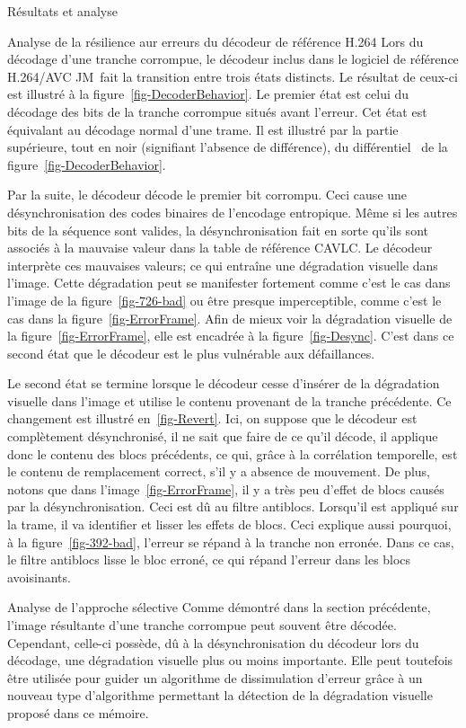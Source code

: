 \documentclass[letterpaper, twoside, 12pt,memoire]{thETS}
\newcommand{\ltCodec}{logiciel de référence H.264/AVC JM}
\newcommand{\fig}[1]{figure~\ref{#1}}
\begin{document}
\begin{chapter}{Résultats et analyse}
\begin{section}{Analyse de la résilience aur erreurs du décodeur de référence H.264}
Lors du décodage d'une tranche corrompue, le décodeur inclus dans le
\ltCodec~fait la transition entre trois états distincts. Le résultat de ceux-ci
est illustré à la \fig{fig-DecoderBehavior}. Le premier état est celui du
décodage des bits de la tranche corrompue situés avant l'erreur. Cet état est
équivalant au décodage normal d'une trame. Il est illustré par la partie
supérieure, tout en noir (signifiant l'absence de différence), du
différentiel~ de la \fig{fig-DecoderBehavior}.

Par la suite, le décodeur décode le premier bit corrompu. Ceci cause une
désynchronisation des codes binaires de l'encodage entropique. Même si les
autres bits de la séquence sont valides, la désynchronisation fait en sorte
qu'ils sont associés à la mauvaise valeur dans la table de référence CAVLC. Le
décodeur interprète ces mauvaises valeurs; ce qui entraîne une dégradation
visuelle dans l'image. Cette dégradation peut se manifester fortement comme
c'est le cas dans l'image de la \fig{fig-726-bad} ou être presque imperceptible,
comme c'est le cas dans la \fig{fig-ErrorFrame}. Afin de mieux voir la
dégradation visuelle de la \fig{fig-ErrorFrame}, elle est encadrée à la
\fig{fig-Desync}. C'est dans ce second état que le décodeur est le plus
vulnérable aux défaillances.

Le second état se termine lorsque le décodeur cesse d'insérer de la dégradation
visuelle dans l'image et utilise le contenu provenant de la tranche précédente.
Ce changement est illustré en~\ref{fig-Revert}. Ici, on suppose que le décodeur
est complètement désynchronisé, il ne sait que faire de ce qu'il décode, il
applique donc le contenu des blocs précédents, ce qui, grâce à la corrélation
temporelle, est le contenu de remplacement correct, s'il y a absence de
mouvement. De plus, notons que dans l'image~\ref{fig-ErrorFrame}, il y a très
peu d'effet de blocs causés par la désynchronisation. Ceci est dû au filtre
antiblocs. Lorsqu'il est appliqué sur la trame, il va identifier et lisser les
effets de blocs. Ceci explique aussi pourquoi, à la \fig{fig-392-bad}, l'erreur
se répand à la tranche non erronée. Dans ce cas, le filtre antiblocs lisse le
bloc erroné, ce qui répand l'erreur dans les blocs avoisinants.

\end{section}

\begin{section}{Analyse de l'approche sélective}
\label{sec-ApprocheSelective}
Comme démontré dans la section précédente, l'image résultante d'une tranche
corrompue peut souvent être décodée. Cependant, celle-ci possède, dû à la
désynchronisation du décodeur lors du décodage, une dégradation visuelle plus ou
moins importante. Elle peut toutefois être utilisée pour guider un algorithme de
dissimulation d'erreur grâce à un nouveau type d'algorithme permettant la
détection de la dégradation visuelle proposé dans ce mémoire.


\end{section}
\end{chapter}
\end{document}
